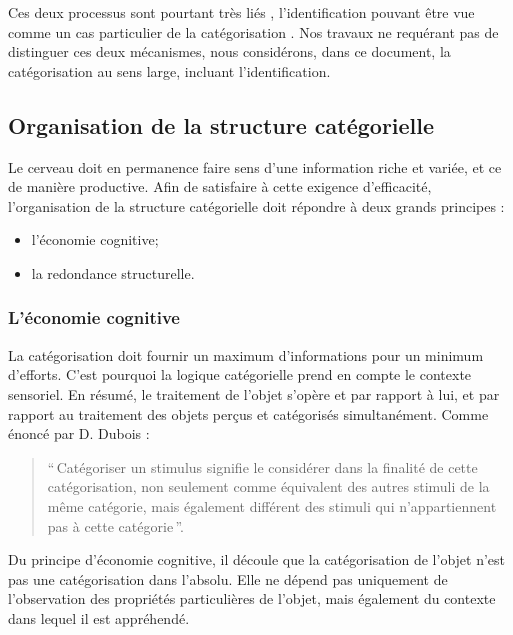 Ces deux processus sont pourtant très liés \citep{goldstone2003concepts}, l'identification pouvant être vue comme un cas particulier de la catégorisation \citep{schyns1998diagnostic}. Nos travaux ne requérant pas de distinguer ces deux mécanismes, nous considérons, dans ce document, la catégorisation au sens large, incluant l'identification.

\subsection{Organisation de la structure catégorielle}

Le cerveau doit en permanence faire sens d'une information riche et variée, et ce de manière productive. Afin de satisfaire à cette exigence d'efficacité, l'organisation  de la structure catégorielle doit répondre à deux grands principes \citep[p. 29]{rosch1978cognition}:

\begin{itemize}
\item l'économie cognitive;
\item la redondance structurelle.
\end{itemize}

\subsubsection{L'économie cognitive}

La catégorisation doit fournir un maximum d'informations pour un minimum d'efforts. C'est pourquoi la logique catégorielle prend en compte le contexte sensoriel. En résumé, le traitement de l'objet s'opère et par rapport à lui, et par rapport au traitement des objets perçus et catégorisés simultanément. Comme énoncé par D. Dubois \citep[p. 33]{dubois1991semantique}:

\begin{quote}
``\,Catégoriser un stimulus signifie le considérer dans la finalité de cette catégorisation, non seulement comme équivalent des autres stimuli de la même catégorie, mais également différent des stimuli qui n'appartiennent pas à cette catégorie\,''.
\end{quote}

Du principe d'économie cognitive, il découle que la catégorisation de l'objet n'est pas une catégorisation dans l'absolu. Elle ne dépend pas uniquement de l'observation des propriétés particulières de l'objet, mais également du contexte dans lequel il est appréhendé.

